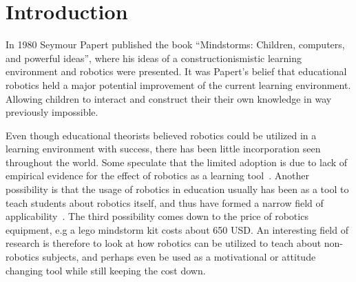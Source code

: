 \section{Introduction}
In 1980 Seymour Papert published the book "`Mindstorms: Children, computers, and powerful ideas"'\cite{papert1980mindstorms}, where his ideas of a constructionismistic 
learning environment and robotics were presented. It was Papert's belief that educational robotics held a major potential improvement of the current learning environment.
Allowing children to interact and construct their their own knowledge in way previously impossible. 

\bigskip\noindent
Even though educational theorists believed robotics could be utilized in a learning environment with success, there has been little
incorporation seen throughout the world. 
Some speculate that the limited adoption is due to lack of empirical evidence for the effect of robotics as a learning tool~\cite{williams2007acquisition}.  
Another possibility is that the usage of robotics in education usually has been as a tool to teach students about robotics itself, 
and thus have formed a narrow field of applicability~\cite{rusk2008new}. 
The third possibility comes down to the price of robotics equipment, e.g a lego mindstorm kit costs about 650 USD. 
An interesting field of research is therefore to look at how robotics can be utilized to teach about non-robotics subjects, and perhaps even be used as a motivational or attitude changing tool while still keeping the cost down. 
